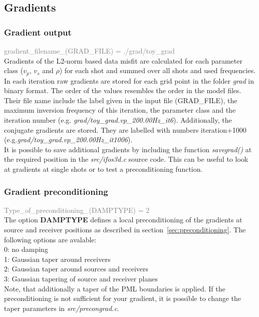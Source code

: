 \subsection{Gradients}
\subsubsection*{Gradient output}
\textcolor {Gray}{gradient\_filename\_(GRAD\_FILE) = ./grad/toy\_grad}\vspace{0.1cm}\\
Gradients of the L2-norm based data misfit are calculated for each parameter class ($v_p$, $v_s$ and $\rho$) for each shot and summed over all shots and used frequencies. In each iteration raw gradients are stored for each grid point in the folder \textit{grad} in binary format. The order of the values resembles the order in the model files. Their file name include the label given in the input file (GRAD\_FILE), the maximum inversion frequency of this iteration, the parameter class and the iteration number (e.g. \textit{grad/toy\_grad.vp\_200.00Hz\_it6}). Additionally, the conjugate gradients are stored. They are labelled with numbers iteration+1000 (e.g.\textit{grad/toy\_grad.vp\_200.00Hz\_it1006}). \\
It is possible to save additional gradients by including the function \textit{savegrad()} at the required position in the \textit{src/ifos3d.c} source code. This can be useful to look at gradients at single shots or to test a preconditioning function.
\subsubsection*{Gradient preconditioning}
\textcolor {Gray}{Type\_of\_preconditioning\_(DAMPTYPE) = 2}\vspace{0.1cm}\\
The option \textbf{DAMPTYPE} defines a local preconditioning of the gradients at source and receiver positions as described in section~\ref{sec:preconditioning}. The following options are avalable:\\
0: no damping\\
1: Gaussian taper around receivers\\
2: Gaussian taper around sources and receivers\\
3: Gaussian tapering of source and receiver planes\\
Note, that additionally a taper of the PML boundaries is applied. If the preconditioning is not sufficient for your gradient, it is possible to change the taper parameters in \textit{src/precongrad.c}. 
